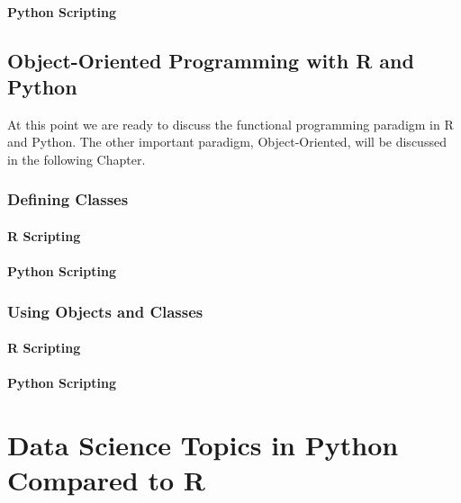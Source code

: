\documentclass[]{book}
\theoremstyle{definition}
\theoremstyle{definition}
\theoremstyle{definition}
\theoremstyle{remark}
\begin{document}
\subsection{Python Scripting}\label{python-scripting-3}

\chapter{Object-Oriented Programming with R and
Python}\label{object-oriented-programming-with-r-and-python}

At this point we are ready to discuss the functional programming
paradigm in R and Python. The other important paradigm, Object-Oriented,
will be discussed in the following Chapter.

\section{Defining Classes}\label{defining-classes}

\subsection{R Scripting}\label{r-scripting-4}

\subsection{Python Scripting}\label{python-scripting-4}

\section{Using Objects and Classes}\label{using-objects-and-classes}

\subsection{R Scripting}\label{r-scripting-5}

\subsection{Python Scripting}\label{python-scripting-5}

\part{Data Science Topics in Python Compared to
R}\label{part-data-science-topics-in-python-compared-to-r}
\end{document}
